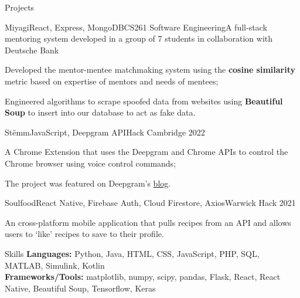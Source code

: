 \documentclass{resume}
\begin{document}
    
    \begin{rSection}{Projects}
        \begin{rSubsection}{Miyagi}{React, Express, MongoDB}{CS261 Software Engineering}{}{A full-stack mentoring system developed in a group of 7 students in collaboration with Deutsche Bank}
            \item Developed the mentor-mentee matchmaking system using the \textbf{cosine similarity} metric based on expertise of mentors and needs of mentees;
            \item Engineered algorithms to scrape spoofed data from websites using \textbf{Beautiful Soup} to insert into our database to act as fake data.
        \end{rSubsection}
        \begin{rSubsection}{Stëmm}{JavaScript, Deepgram API}{Hack Cambridge 2022}{}{}
            \item A Chrome Extension that uses the Deepgram and Chrome APIs to control the Chrome browser using voice control commands;
            \item The project was featured on Deepgram's \href{https://developers.deepgram.com/blog/2022/03/voice-control-browser-stemm/}{blog}. 
        \end{rSubsection}
        \begin{rSubsection}{Soulfood}{React Native, Firebase Auth, Cloud Firestore, Axios}{Warwick Hack 2021}{}{}
            \item An cross-platform mobile application that pulls recipes from an API and allows users to `like' recipes to save to their profile.
        \end{rSubsection}
    \end{rSection}
    \begin{rSection}{Skills}
        \textbf{Languages:} Python, Java, HTML, CSS, JavaScript, PHP, SQL, MATLAB, Simulink, Kotlin\\
        \textbf{Frameworks/Tools:} matplotlib, numpy, scipy, pandas, Flask, React, React Native, Beautiful Soup, Tensorflow, Keras \\ 
    \end{rSection}
\end{document}
